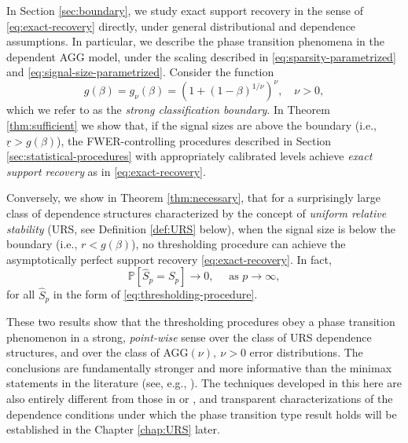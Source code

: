\medskip


In Section \ref{sec:boundary}, we study exact support recovery in the sense of \eqref{eq:exact-recovery} directly, under general distributional and dependence assumptions. 
In particular, we describe the phase transition phenomena in the dependent AGG model, under the scaling described in \eqref{eq:sparsity-parametrized} and \eqref{eq:signal-size-parametrized}.
Consider the function
\begin{equation} \label{eq:strong-classification-boundary}
    g(\beta) = g_\nu(\beta) = (1 + (1 - \beta)^{1/\nu})^\nu, \quad \nu>0,
\end{equation}
which we refer to as the {\em strong classification boundary}.
In Theorem \ref{thm:sufficient} we show that, 
if the signal sizes are above the boundary (i.e., $\underline{r}> g(\beta)$), the \ac{FWER}-controlling procedures described in Section \ref{sec:statistical-procedures} with appropriately calibrated levels achieve \emph{exact support recovery} as in \eqref{eq:exact-recovery}.

Conversely, we show in Theorem \ref{thm:necessary}, that for a surprisingly large class of dependence structures characterized by the concept of \emph{uniform relative stability} (URS, see Definition \ref{def:URS} below), when the signal size is below the boundary  (i.e., $r<g(\beta)$), no thresholding procedure can achieve the asymptotically perfect support recovery \eqref{eq:exact-recovery}. In fact,
\begin{equation} \label{eq:exact-recovery-failure}
    \mathbb{P}\left[\widehat{S}_p=S_p\right]\longrightarrow 0,\quad \mbox{ as }p\to \infty,
\end{equation}
for all $\widehat{S}_p$ in the form of \eqref{eq:thresholding-procedure}.

These two results show that the thresholding procedures obey a phase transition phenomenon in a strong, \emph{point-wise} sense over the class of URS dependence structures, and over the class of AGG$(\nu),\ \nu>0$ error distributions. 
The conclusions are fundamentally stronger and more informative than the minimax statements in the literature (see, e.g., \cite{butucea2018variable}).
The techniques developed in this here are also entirely different from those in \citet{ji2012ups} or \citet{butucea2018variable}, and transparent characterizations of the dependence conditions under which the phase transition type result holds will be established in the Chapter \ref{chap:URS} later.


